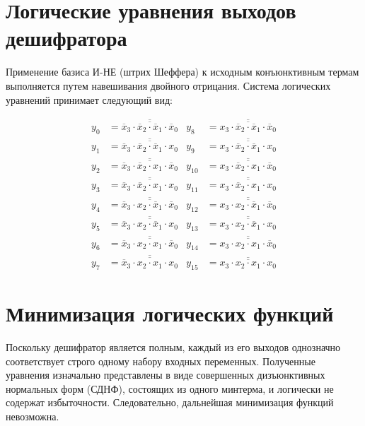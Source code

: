 \documentclass[oneside,a4paper,14pt]{extarticle}
\begin{document}
\section{Логические уравнения выходов дешифратора}
Применение базиса И-НЕ (штрих Шеффера) к исходным конъюнктивным термам выполняется путем навешивания двойного отрицания. Система логических уравнений принимает следующий вид:

\begin{align*}
  y_0  &= \overline{\overline{\overline{x}_3 \cdot \overline{x}_2 \cdot \overline{x}_1 \cdot \overline{x}_0}} & 
  y_8  &= \overline{\overline{x_3 \cdot \overline{x}_2 \cdot \overline{x}_1 \cdot \overline{x}_0}} \\
  y_1  &= \overline{\overline{\overline{x}_3 \cdot \overline{x}_2 \cdot \overline{x}_1 \cdot x_0}} & 
  y_9  &= \overline{\overline{x_3 \cdot \overline{x}_2 \cdot \overline{x}_1 \cdot x_0}} \\
  y_2  &= \overline{\overline{\overline{x}_3 \cdot \overline{x}_2 \cdot x_1 \cdot \overline{x}_0}} & 
  y_{10} &= \overline{\overline{x_3 \cdot \overline{x}_2 \cdot x_1 \cdot \overline{x}_0}} \\
  y_3  &= \overline{\overline{\overline{x}_3 \cdot \overline{x}_2 \cdot x_1 \cdot x_0}} & 
  y_{11} &= \overline{\overline{x_3 \cdot \overline{x}_2 \cdot x_1 \cdot x_0}} \\
  y_4  &= \overline{\overline{\overline{x}_3 \cdot x_2 \cdot \overline{x}_1 \cdot \overline{x}_0}} & 
  y_{12} &= \overline{\overline{x_3 \cdot x_2 \cdot \overline{x}_1 \cdot \overline{x}_0}} \\
  y_5  &= \overline{\overline{\overline{x}_3 \cdot x_2 \cdot \overline{x}_1 \cdot x_0}} & 
  y_{13} &= \overline{\overline{x_3 \cdot x_2 \cdot \overline{x}_1 \cdot x_0}} \\
  y_6  &= \overline{\overline{\overline{x}_3 \cdot x_2 \cdot x_1 \cdot \overline{x}_0}} & 
  y_{14} &= \overline{\overline{x_3 \cdot x_2 \cdot x_1 \cdot \overline{x}_0}} \\
  y_7  &= \overline{\overline{\overline{x}_3 \cdot x_2 \cdot x_1 \cdot x_0}} & 
  y_{15} &= \overline{\overline{x_3 \cdot x_2 \cdot x_1 \cdot x_0}}
\end{align*}

\section{Минимизация логических функций}
Поскольку дешифратор является полным, каждый из его выходов однозначно соответствует строго одному набору входных переменных. Полученные уравнения изначально представлены в виде совершенных дизъюнктивных нормальных форм (СДНФ), состоящих из одного минтерма, и логически не содержат избыточности. Следовательно, дальнейшая минимизация функций невозможна.
\end{document}
